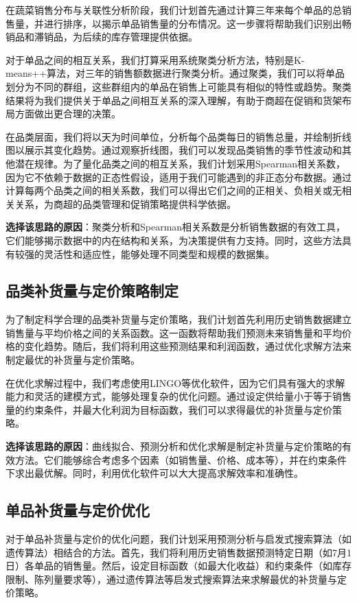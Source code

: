 \documentclass{cumcmthesis}
\begin{document}
在蔬菜销售分布与关联性分析阶段，我们计划首先通过计算三年来每个单品的总销售量，并进行排序，以揭示单品销售量的分布情况。这一步骤将帮助我们识别出畅销品和滞销品，为后续的库存管理提供依据。

对于单品之间的相互关系，我们打算采用系统聚类分析方法，特别是K-means++算法，对三年的销售额数据进行聚类分析。通过聚类，我们可以将单品划分为不同的群组，这些群组内的单品在销售上可能具有相似的特性或趋势。聚类结果将为我们提供关于单品之间相互关系的深入理解，有助于商超在促销和货架布局方面做出更合理的决策。

在品类层面，我们将以天为时间单位，分析每个品类每日的销售总量，并绘制折线图以展示其变化趋势。通过观察折线图，我们可以发现品类销售的季节性波动和其他潜在规律。为了量化品类之间的相互关系，我们计划采用Spearman相关系数，因为它不依赖于数据的正态性假设，适用于我们可能遇到的非正态分布数据。通过计算每两个品类之间的相关系数，我们可以得出它们之间的正相关、负相关或无相关关系，为商超的品类管理和促销策略提供科学依据。

\textbf{选择该思路的原因}：聚类分析和Spearman相关系数是分析销售数据的有效工具，它们能够揭示数据中的内在结构和关系，为决策提供有力支持。同时，这些方法具有较强的灵活性和适应性，能够处理不同类型和规模的数据集。

\subsection{品类补货量与定价策略制定}

为了制定科学合理的品类补货量与定价策略，我们计划首先利用历史销售数据建立销售量与平均价格之间的关系函数。这一函数将帮助我们预测未来销售量和平均价格的变化趋势。随后，我们将利用这些预测结果和利润函数，通过优化求解方法来制定最优的补货量与定价策略。

在优化求解过程中，我们考虑使用LINGO等优化软件，因为它们具有强大的求解能力和灵活的建模方式，能够处理复杂的优化问题。通过设定供给量小于等于销售量的约束条件，并最大化利润为目标函数，我们可以求得最优的补货量与定价策略。

\textbf{选择该思路的原因}：曲线拟合、预测分析和优化求解是制定补货量与定价策略的有效方法。它们能够综合考虑多个因素（如销售量、价格、成本等），并在约束条件下求出最优解。同时，利用优化软件可以大大提高求解效率和准确性。

\subsection{单品补货量与定价优化}

对于单品补货量与定价的优化问题，我们计划采用预测分析与启发式搜索算法（如遗传算法）相结合的方法。首先，我们将利用历史销售数据预测特定日期（如7月1日）各单品的销售量。然后，设定目标函数（如最大化收益）和约束条件（如库存限制、陈列量要求等），通过遗传算法等启发式搜索算法来求解最优的补货量与定价策略。
\end{document}
